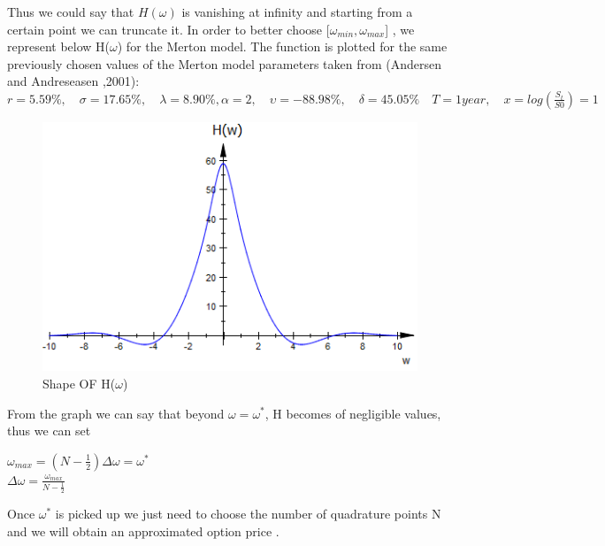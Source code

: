 \documentclass[12pt]{report}
\begin{document}
Thus we could say that $H(\omega)$ is vanishing at infinity and starting from a certain point we can truncate it. In order to better choose [$\omega_{min},\omega_{max}$] , we represent below H($\omega$) for the Merton model. The function is plotted for the same previously chosen values of the Merton model parameters taken from (Andersen and Andreseasen ,2001):\\ 
$ r =5.59 \%,\quad \sigma=17.65\%,\quad  \lambda=8.90\%, \alpha=2,\quad \upsilon = -88.98\%,\quad  \delta=45.05\% \quad T=1 year,\quad x=log(\frac{S_t}{S0})=1 $ 
\\
\begin{figure}[H]
\centering
\includegraphics{H.png} 
\caption{Shape OF H($\omega$)}
\end{figure}

 
From the graph we can say that beyond $\omega=\omega^* $, H becomes of negligible values, thus we can set
\begin{center}
$\omega_{max}=(N-\frac{1}{2})\Delta \omega=\omega^*$\\
$\Delta \omega= \frac{\omega_{max}}{N-\frac{1}{2}}$
\end{center} 

Once $\omega^*$ is picked up we just need to choose the number of quadrature points N and we will obtain an approximated option price .
\end{document}
